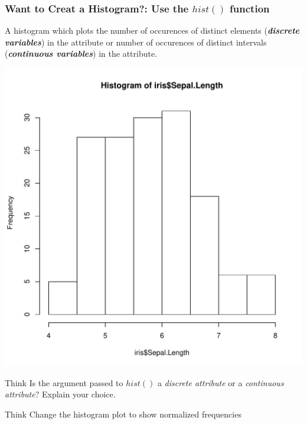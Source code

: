 \subsubsection{Want to Creat a Histogram?: Use the $hist()$ function}
\noindent A histogram which plots the number of occurences of distinct elements (\textbf{\emph{discrete variables}}) in the attribute or number of occurences of distinct intervals (\textbf{\emph{continuous variables}}) in the attribute.
\begin{knitrout}
\color{fgcolor}\begin{kframe}
\begin{alltt}
\hlopt{$}
\end{alltt}
\end{kframe}
\includegraphics[width=\maxwidth]{figure/hist-1} 

\end{knitrout}

\begin{DIY}{Think}
Is the argument passed to $hist()$ a \emph{discrete attribute} or a \emph{continuous attribute}? Explain your choice.
\end{DIY}

\begin{DIY}{Think}
Change the histogram plot to show normalized frequencies
\end{DIY}
